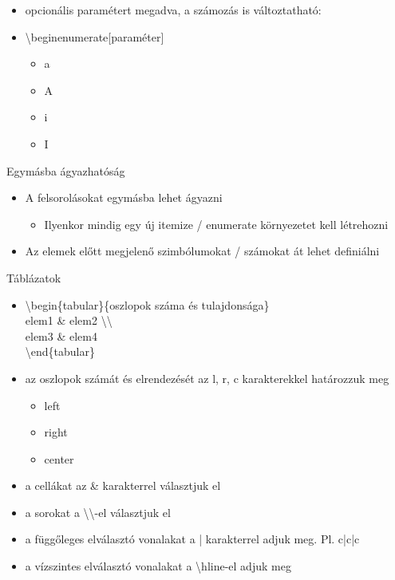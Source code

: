 \documentclass[11pt]{beamer}
\newcommand{\tbs}{\textbackslash}
\begin{document}
\begin{frame}
\begin{itemize}
\item opcionális paramétert megadva, a számozás is változtatható:
\item \tbs begin{enumerate}[paraméter]
	\begin{itemize}
	\item a
	\item A
	\item i
	\item I
	\end{itemize}
\end{itemize}
\end{frame}

\begin{frame}{Egymásba ágyazhatóság}
\begin{itemize}
\item	A felsorolásokat egymásba lehet ágyazni
	\begin{itemize}
	\item Ilyenkor mindig egy új itemize / enumerate környezetet kell létrehozni
	\end{itemize}
\item	Az elemek előtt megjelenő szimbólumokat / számokat át lehet definiálni
\end{itemize}
\end{frame}

\begin{frame}{Táblázatok}
\begin{itemize}
\item	\tbs begin\{tabular\}\{oszlopok száma és tulajdonsága\} \\ 
		elem1 \& elem2 \tbs \tbs \\ 
		elem3 \& elem4  \\ 
		\tbs end\{tabular\} \\
\item	az oszlopok számát és elrendezését az l, r, c karakterekkel határozzuk meg
		\begin{itemize}
		\item	left
		\item	right
		\item	center
		\end{itemize}
\item	a cellákat az \& karakterrel választjuk el
\item	a sorokat a \tbs \tbs -el választjuk el
\item	a függőleges elválasztó vonalakat a | karakterrel adjuk meg. Pl. c|c|c
\item	a vízszintes elválasztó vonalakat a \tbs hline-el adjuk meg
\end{itemize}
\end{frame}
\end{document}
